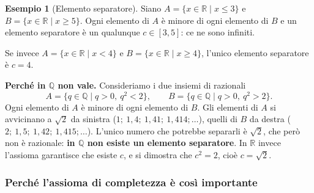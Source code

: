 \documentclass[11pt,a4paper]{article}
\theoremstyle{definition}
\newtheorem*{esempio}{Esempio}
\begin{document}
\begin{esempio}[Elemento separatore]
Siano $A = \{x \in \mathbb{R} \mid x \leq 3\}$ e $B = \{x \in \mathbb{R} \mid x \geq 5\}$. Ogni elemento di $A$ è minore di ogni elemento di $B$ e un elemento separatore è un qualunque $c \in [3, 5]$: ce ne sono infiniti.

Se invece $A = \{x \in \mathbb{R} \mid x < 4\}$ e $B = \{x \in \mathbb{R} \mid x \geq 4\}$, l'unico elemento separatore è $c = 4$.
\end{esempio}

\textbf{Perché in $\mathbb{Q}$ non vale.} Consideriamo i due insiemi di
razionali
\[
A = \{q \in \mathbb{Q} \mid q > 0,\ q^2 < 2\}, \qquad
B = \{q \in \mathbb{Q} \mid q > 0,\ q^2 > 2\}.
\]
Ogni elemento di $A$ è minore di ogni elemento di $B$. Gli elementi di $A$
si avvicinano a $\sqrt{2}$ da sinistra ($1;\ 1{,}4;\ 1{,}41;\ 1{,}414;
\dots$), quelli di $B$ da destra ($2;\ 1{,}5;\ 1{,}42;\ 1{,}415; \dots$).
L'unico numero che potrebbe separarli è $\sqrt{2}$, che però non è
razionale: \textbf{in $\mathbb{Q}$ non esiste un elemento separatore}.
In $\mathbb{R}$ invece l'assioma garantisce che esiste $c$, e si dimostra
che $c^2 = 2$, cioè $c = \sqrt{2}$.

\subsubsection*{Perché l'assioma di completezza è così importante}
\end{document}
